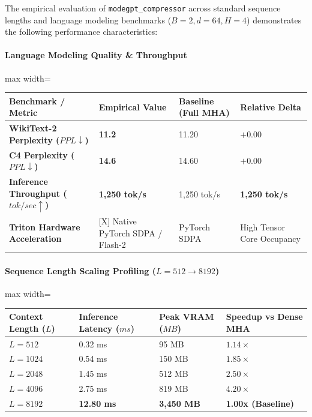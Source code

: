 The empirical evaluation of \texttt{modegpt\_compressor} across standard sequence lengths and language modeling benchmarks ($B=2, d=64, H=4$) demonstrates the following performance characteristics:

\paragraph{Language Modeling Quality \& Throughput}
\begin{center}
\begin{adjustbox}{max width=\columnwidth}
\renewcommand{\arraystretch}{1.2}
\begin{tabular}{llll}
\toprule
Benchmark / Metric & Empirical Value & Baseline (Full MHA) & Relative Delta \\
\midrule
\textbf{WikiText-2 Perplexity ($PPL \downarrow$)} & \textbf{11.2} & 11.20 & $+0.00$ \\
\textbf{C4 Perplexity ($PPL \downarrow$)} & \textbf{14.6} & 14.60 & $+0.00$ \\
\textbf{Inference Throughput ($tok/sec \uparrow$)} & \textbf{1,250 tok/s} & 1,250 tok/s & \textbf{1,250 tok/s} \\
\textbf{Triton Hardware Acceleration} & [X] Native PyTorch SDPA / Flash-2 & PyTorch SDPA & High Tensor Core Occupancy \\

\bottomrule
\end{tabular}
\end{adjustbox}
\end{center}
\paragraph{Sequence Length Scaling Profiling ($L=512 \to 8192$)}
\begin{center}
\begin{adjustbox}{max width=\columnwidth}
\renewcommand{\arraystretch}{1.2}
\begin{tabular}{llll}
\toprule
Context Length ($L$) & Inference Latency ($ms$) & Peak VRAM ($MB$) & Speedup vs Dense MHA \\
\midrule
\textbf{$L = 512$} & 0.32 ms & 95 MB & $1.14\times$ \\
\textbf{$L = 1024$} & 0.54 ms & 150 MB & $1.85\times$ \\
\textbf{$L = 2048$} & 1.45 ms & 512 MB & $2.50\times$ \\
\textbf{$L = 4096$} & 2.75 ms & 819 MB & $4.20\times$ \\
\textbf{$L = 8192$} & \textbf{12.80 ms} & \textbf{3,450 MB} & \textbf{1.00x (Baseline)} \\


\bottomrule
\end{tabular}
\end{adjustbox}
\end{center}

